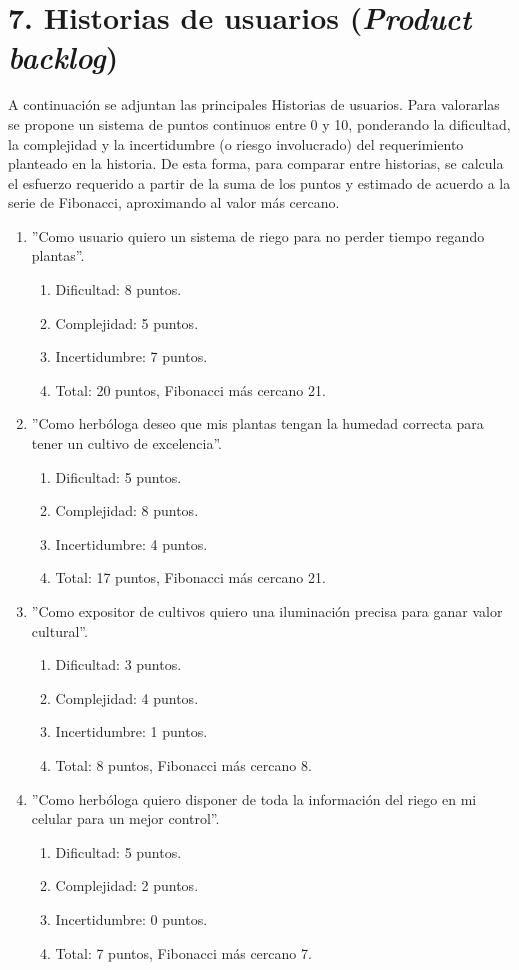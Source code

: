 \documentclass[
11pt, %
]{charter}
\begin{document}
\section{7. Historias de usuarios (\textit{Product backlog})}
\label{sec:backlog}

A continuación se adjuntan las principales Historias de usuarios. Para valorarlas se propone un sistema de puntos continuos entre 0 y 10, ponderando la dificultad, la complejidad y la incertidumbre (o riesgo involucrado) del requerimiento planteado en la historia. De esta forma, para comparar entre historias, se calcula el esfuerzo requerido a partir de la suma de los puntos y estimado de acuerdo a la serie de Fibonacci, aproximando al valor más cercano.
\begin{enumerate}
	\item ''Como usuario quiero un sistema de riego para no perder tiempo regando plantas''.
	\begin{enumerate}
		\item Dificultad: 8 puntos.
		\item Complejidad: 5 puntos.
		\item Incertidumbre: 7 puntos.
		\item Total: 20 puntos, Fibonacci más cercano 21.
	\end{enumerate}
	\item ''Como herbóloga deseo que mis plantas tengan la humedad correcta para tener un cultivo de excelencia''.
	\begin{enumerate}
		\item Dificultad: 5 puntos.
		\item Complejidad: 8 puntos.
		\item Incertidumbre: 4 puntos.
		\item Total: 17 puntos, Fibonacci más cercano 21.
	\end{enumerate}
	\item ''Como expositor de cultivos quiero una iluminación precisa para ganar valor cultural''.
	\begin{enumerate}
		\item Dificultad: 3 puntos.
		\item Complejidad: 4 puntos.
		\item Incertidumbre: 1 puntos.
		\item Total: 8 puntos, Fibonacci más cercano 8.
	\end{enumerate}
	\item ''Como herbóloga quiero disponer de toda la información del riego en mi celular para un mejor control''.
	\begin{enumerate}
		\item Dificultad: 5 puntos.
		\item Complejidad: 2 puntos.
		\item Incertidumbre: 0 puntos.
		\item Total: 7 puntos, Fibonacci más cercano 7.
	\end{enumerate}
\end{enumerate}
\end{document}
